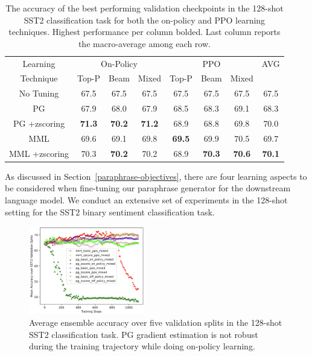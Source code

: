 \documentclass[11pt]{article}
\begin{document}
\begin{table}
\centering
\caption{The accuracy of the best performing validation checkpoints in the 128-shot SST2 classification task for both the on-policy and PPO learning techniques. Highest performance per column bolded. Last column reports the macro-average among each row.}
\begin{tabular}{ c | c c c | c c c | c}
\hline
Learning & \multicolumn{3}{c|}{On-Policy} & \multicolumn{3}{c|}{PPO} & AVG \\
Technique & \small{Top-P} & \small{Beam} & \small{Mixed} & \small{Top-P} & \small{Beam} & \small{Mixed} & \\
\hline
No Tuning & \small67.5 & \small67.5 & \small67.5 & \small67.5 & \small67.5 & \small67.5 & \small67.5\\
\hline
PG & \small67.9 & \small68.0 & \small67.9 & \small68.5 & \small68.3 & \small69.1 & \small68.3\\
PG \small +zscoring & \small\textbf{71.3} & \small\textbf{70.2} & \small\textbf{71.2} & \small68.9 & \small68.8 & \small69.8 & \small70.0 \\
\hline
MML & \small69.6 & \small69.1 & \small69.8 & \small\textbf{69.5} & \small69.9 & \small70.5 & \small69.7 \\
MML \small +zscoring & \small70.3 & \small\textbf{70.2} & \small70.2 & \small68.9 & \small\textbf{70.3} & \small\textbf{70.6} & \small\textbf{70.1}\\
\hline
\end{tabular}
\label{maximum-curves-on-ppo}
\end{table}

As discussed in Section~\ref{paraphrase-objectives}, there are four learning aspects to be considered when fine-tuning our paraphrase generator for the downstream language model. We conduct an extensive set of experiments in the 128-shot setting for the SST2 binary sentiment classification task.

\begin{figure}[h]
\begin{center}
\includegraphics[width=0.45\textwidth]{mml_pg_comparisons.png}
\end{center}
\caption{Average ensemble accuracy over five validation splits in the 128-shot SST2 classification task. PG gradient estimation is not robust during the training trajectory while doing on-policy learning.}
\label{pg_divergence}
\end{figure}
\end{document}
